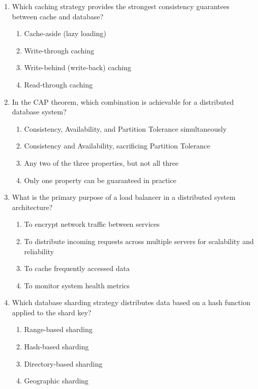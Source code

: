 \documentclass[11pt]{article}
\begin{document}
\begin{enumerate}[label=\textbf{\arabic*.}]

  \item Which caching strategy provides the strongest consistency guarantees between cache and 
  database?
  \begin{enumerate}[label=(\Alph*)]
    \item Cache-aside (lazy loading)
    \item Write-through caching
    \item Write-behind (write-back) caching
    \item Read-through caching
  \end{enumerate}

  \item In the CAP theorem, which combination is achievable for a distributed database system?
  \begin{enumerate}[label=(\Alph*)]
    \item Consistency, Availability, and Partition Tolerance simultaneously
    \item Consistency and Availability, sacrificing Partition Tolerance
    \item Any two of the three properties, but not all three
    \item Only one property can be guaranteed in practice
  \end{enumerate}

  \item What is the primary purpose of a load balancer in a distributed system architecture?
  \begin{enumerate}[label=(\Alph*)]
    \item To encrypt network traffic between services
    \item To distribute incoming requests across multiple servers for scalability and reliability
    \item To cache frequently accessed data
    \item To monitor system health metrics
  \end{enumerate}

  \item Which database sharding strategy distributes data based on a hash function applied to the 
  shard key?
  \begin{enumerate}[label=(\Alph*)]
    \item Range-based sharding
    \item Hash-based sharding
    \item Directory-based sharding
    \item Geographic sharding
  \end{enumerate}


\end{enumerate}
\end{document}
